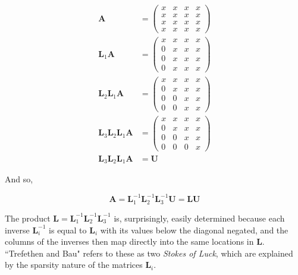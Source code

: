 \begin{equation}
\begin{split}
\mathbf{A} &=
\begin{pmatrix}
x & x & x & x \\
x & x & x & x \\
x & x & x & x \\
x & x & x & x
\end{pmatrix} \\
\mathbf{L}_1\mathbf{A} &=
\begin{pmatrix}
x & x & x & x \\
0 & x & x & x \\
0 & x & x & x \\
0 & x & x & x
\end{pmatrix} \\
\mathbf{L}_2\mathbf{L}_1\mathbf{A} &=
\begin{pmatrix}
x & x & x & x \\
0 & x & x & x \\
0 & 0 & x & x \\
0 & 0 & x & x
\end{pmatrix} \\
\mathbf{L}_3\mathbf{L}_2\mathbf{L}_1\mathbf{A} &=
\begin{pmatrix}
x & x & x & x \\
0 & x & x & x \\
0 & 0 & x & x \\
0 & 0 & 0 & x
\end{pmatrix} \\
\mathbf{L}_3\mathbf{L}_2\mathbf{L}_1\mathbf{A} &= \mathbf{U}
\end{split}
\end{equation}

And so,

\begin{equation}
\mathbf{A} = \mathbf{L}_1^{-1}\mathbf{L}_2^{-1}\mathbf{L}_3^{-1}\mathbf{U} = \mathbf{L}\mathbf{U}
\end{equation}

The product $\mathbf{L} = \mathbf{L}_1^{-1}\mathbf{L}_2^{-1}\mathbf{L}_3^{-1}$ is, surprisingly, easily determined because each inverse $\mathbf{L}_i^{-1}$ is equal to $\mathbf{L}_i$ with its values below the diagonal negated, and the columns of the inverses then map directly into the same locations in $\mathbf{L}$. ``Trefethen and Bau" \cite{numerical-linear-algebra} refers to these as two \emph{Stokes of Luck}, which are explained by the sparsity nature of the matrices $\mathbf{L}_i$. 


